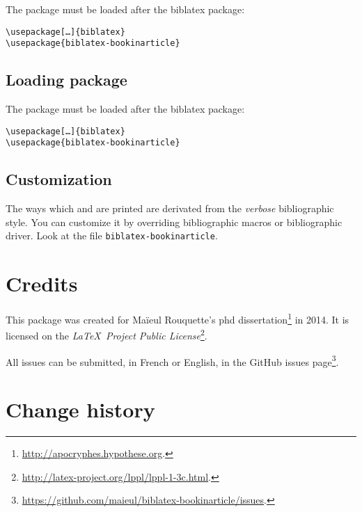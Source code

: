 \documentclass{ltxdockit}[2011/03/25]
\newcommand{\biblatex}{biblatex\xspace}
\begin{document}
The package must be loaded after the \biblatex package:
\begin{verbatim}
\usepackage[…]{biblatex}
\usepackage{biblatex-bookinarticle}
\end{verbatim}

\subsection{Loading package}

The package must be loaded after the \biblatex package:
\begin{verbatim}
\usepackage[…]{biblatex}
\usepackage{biblatex-bookinarticle}
\end{verbatim}

\subsection{Customization}

The ways which  and  are printed are derivated from the \emph{verbose} bibliographic style. You can customize it by overriding bibliographic macros or bibliographic driver. Look at the file \verb+biblatex-bookinarticle+.

\section{Credits}

This package was created for Maïeul Rouquette's phd dissertation\footnote{\url{http://apocryphes.hypothese.org}.} in 2014. It is licensed on the \emph{\LaTeX\ Project Public License}\footnote{\url{http://latex-project.org/lppl/lppl-1-3c.html}.}. 


All issues can be submitted, in French or English, in the GitHub issues page\footnote{\url{https://github.com/maieul/biblatex-bookinarticle/issues}.}.


\section{Change history}
\end{document}
